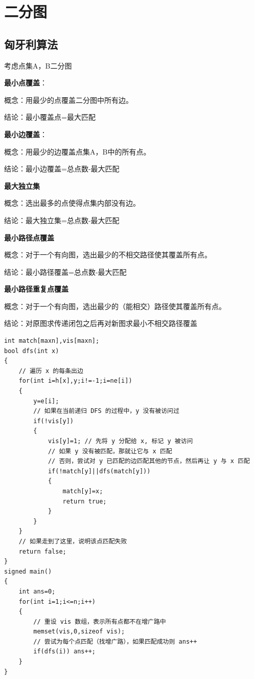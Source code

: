 \section{二分图}
\subsection{匈牙利算法}
\par \noindent 考虑点集A，B二分图
\par \noindent \textbf{最小点覆盖}：
\par \noindent 概念：用最少的点覆盖二分图中所有边。
\par \noindent 结论：最小覆盖点=最大匹配
\par \noindent 
\par \noindent \textbf{最小边覆盖}：
\par \noindent 概念：用最少的边覆盖点集A，B中的所有点。
\par \noindent 结论：最小边覆盖=总点数-最大匹配
\par \noindent 
\par \noindent \textbf{最大独立集}
\par \noindent 概念：选出最多的点使得点集内部没有边。
\par \noindent 结论：最大独立集=总点数-最大匹配
\par \noindent 
\par \noindent \textbf{最小路径点覆盖}
\par \noindent 概念：对于一个有向图，选出最少的不相交路径使其覆盖所有点。
\par \noindent 结论：最小路径覆盖=总点数-最大匹配
\par \noindent 
\par \noindent \textbf{最小路径重复点覆盖}
\par \noindent 概念：对于一个有向图，选出最少的（能相交）路径使其覆盖所有点。
\par \noindent 结论：对原图求传递闭包之后再对新图求最小不相交路径覆盖

\begin{verbatim}
int match[maxn],vis[maxn];
bool dfs(int x)
{
    // 遍历 x 的每条出边
    for(int i=h[x],y;i!=-1;i=ne[i])
    {
        y=e[i];
        // 如果在当前递归 DFS 的过程中，y 没有被访问过
        if(!vis[y])
        {
            vis[y]=1; // 先将 y 分配给 x, 标记 y 被访问
            // 如果 y 没有被匹配，那就让它与 x 匹配
            // 否则，尝试对 y 已匹配的边匹配其他的节点，然后再让 y 与 x 匹配
            if(!match[y]||dfs(match[y]))
            {
                match[y]=x;
                return true;
            }
        }
    }
    // 如果走到了这里，说明该点匹配失败
    return false;
}
signed main()
{
    int ans=0;
    for(int i=1;i<=n;i++)
    {
        // 重设 vis 数组，表示所有点都不在增广路中
        memset(vis,0,sizeof vis);
        // 尝试为每个点匹配（找增广路），如果匹配成功则 ans++
        if(dfs(i)) ans++;
    }
}
\end{verbatim}

